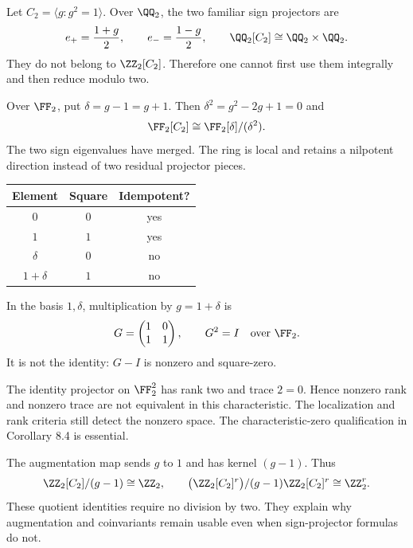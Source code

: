 Let $C_2=\langle g:g^2=1\rangle$. Over $\QQ_2$, the two familiar sign projectors are
\[
e_+=\frac{1+g}{2},\qquad e_-=\frac{1-g}{2},
\qquad \QQ_2[C_2]\cong\QQ_2\times\QQ_2.
\]
They do not belong to $\ZZ_2[C_2]$. Therefore one cannot first use them integrally and then reduce modulo two.

Over $\FF_2$, put $\delta=g-1=g+1$. Then $\delta^2=g^2-2g+1=0$ and
\[
\FF_2[C_2]\cong\FF_2[\delta]/(\delta^2).
\]
The two sign eigenvalues have merged. The ring is local and retains a nilpotent direction instead of two residual projector pieces.

\begin{minipage}[c]{.48\linewidth}
\centering
\begin{tabular}{@{}ccc@{}}\toprule
Element & Square & Idempotent?\\\midrule
$0$ & $0$ & yes\\
$1$ & $1$ & yes\\
$\delta$ & $0$ & no\\
$1+\delta$ & $1$ & no\\\bottomrule
\end{tabular}
\end{minipage}\hfill
\begin{minipage}[c]{.47\linewidth}
In the basis $1,\delta$, multiplication by $g=1+\delta$ is
\[
G=\begin{pmatrix}1&0\\1&1\end{pmatrix},\qquad
G^2=I\quad\text{over }\FF_2.
\]
It is not the identity: $G-I$ is nonzero and square-zero.
\end{minipage}

The identity projector on $\FF_2^2$ has rank two and trace $2=0$. Hence nonzero rank and nonzero trace are not equivalent in this characteristic. The localization and rank criteria still detect the nonzero space. The characteristic-zero qualification in Corollary 8.4 is essential.

The augmentation map sends $g$ to $1$ and has kernel $(g-1)$. Thus
\[
\ZZ_2[C_2]/(g-1)\cong\ZZ_2,
\qquad
\bigl(\ZZ_2[C_2]^r\bigr)/(g-1)\ZZ_2[C_2]^r\cong\ZZ_2^r.
\]
These quotient identities require no division by two. They explain why augmentation and coinvariants remain usable even when sign-projector formulas do not.

